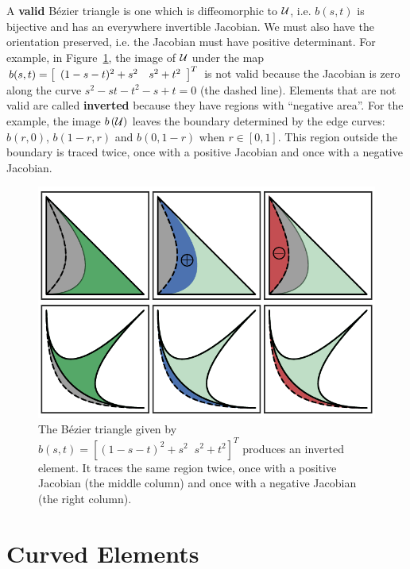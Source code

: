 A \textbf{valid} B\'{e}zier triangle is one which is
diffeomorphic to \(\mathcal{U}\), i.e. \(b(s, t)\) is bijective and has
an everywhere invertible Jacobian. We must also have the orientation
preserved, i.e. the Jacobian must have positive determinant. For example, in
Figure~\ref{fig:inverted-element}, the image of \(\mathcal{U}\) under
the map \(b(s, t) = \left[\begin{array}{c c} (1 - s - t)^2 + s^2 & s^2 + t^2
\end{array}\right]^T\) is not valid because the Jacobian is zero along
the curve \(s^2 - st - t^2 - s + t = 0\) (the dashed line). Elements that
are not valid are called \textbf{inverted} because they have regions with
``negative area''. For the example, the image \(b\left(\mathcal{U}\right)\)
leaves the boundary determined by the edge curves: \(b(r, 0)\),
\(b(1 - r, r)\) and \(b(0, 1 - r)\) when \(r \in \left[0, 1\right]\).
This region outside the boundary is traced twice, once with
a positive Jacobian and once with a negative Jacobian.
\begin{figure}
  \includegraphics{../images/preliminaries/inverted_element.pdf}
  \centering
  \captionsetup{width=.75\linewidth}
  \caption{The B\'{e}zier triangle given by \(b(s, t) = \left[
    (1 - s - t)^2 + s^2 \; \; s^2 + t^2 \right]^T\) produces an
    inverted element. It traces the same region twice, once with
    a positive Jacobian (the middle column) and once with a negative
    Jacobian (the right column).}
  \label{fig:inverted-element}
\end{figure}

\section{Curved Elements}\label{sec:curved-elements}

